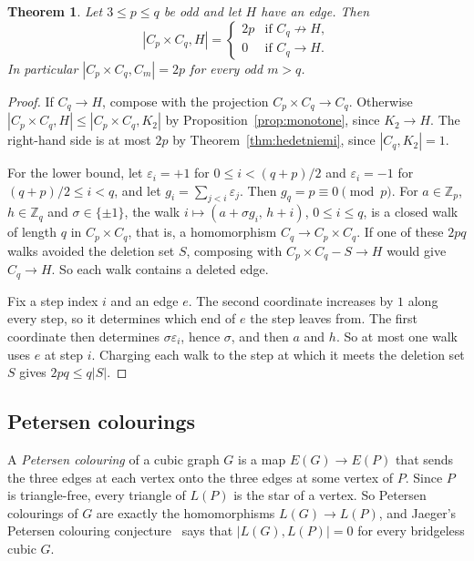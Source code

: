 \documentclass{article}
\newtheorem{theorem}{Theorem}[section]
\theoremstyle{definition}
\begin{document}
\begin{theorem}
\label{thm:CpCq}
Let $3\le p\le q$ be odd and let $H$ have an edge.  Then
\[
  |C_p\times C_q,H|=\begin{cases}2p & \text{if } C_q\not\to H,\\
  0 & \text{if } C_q\to H.\end{cases}
\]
In particular $|C_p\times C_q,C_m|=2p$ for every odd $m>q$.
\end{theorem}

\begin{proof}
If $C_q\to H$, compose with the projection $C_p\times C_q\to C_q$.  Otherwise
$|C_p\times C_q,H|\le|C_p\times C_q,K_2|$ by Proposition~\ref{prop:monotone}, since
$K_2\to H$.  The right-hand side is at most $2p$ by Theorem~\ref{thm:hedetniemi},
since $|C_q,K_2|=1$.

For the lower bound, let $\varepsilon_i=+1$ for $0\le i<(q+p)/2$ and
$\varepsilon_i=-1$ for $(q+p)/2\le i<q$, and let $g_i=\sum_{j<i}\varepsilon_j$.
Then $g_q=p\equiv0\pmod p$.  For $a\in\mathbb Z_p$, $h\in\mathbb Z_q$ and
$\sigma\in\{\pm1\}$, the walk $i\mapsto(a+\sigma g_i,\,h+i)$, $0\le i\le q$, is a
closed walk of length $q$ in $C_p\times C_q$, that is, a homomorphism
$C_q\to C_p\times C_q$.  If one of these $2pq$ walks avoided the deletion set $S$,
composing with $C_p\times C_q-S\to H$ would give $C_q\to H$.  So each walk
contains a deleted edge.

Fix a step index $i$ and an edge $e$.  The second coordinate increases by $1$
along every step, so it determines which end of $e$ the step leaves from.  The
first coordinate then determines $\sigma\varepsilon_i$, hence $\sigma$, and then
$a$ and $h$.  So at most one walk uses $e$ at step $i$.  Charging each walk to
the step at which it meets the deletion set $S$ gives $2pq\le q|S|$.
\end{proof}

\subsection{Petersen colourings}

A \emph{Petersen colouring} of a cubic graph $G$ is a map $E(G)\to E(P)$ that
sends the three edges at each vertex onto the three edges at some vertex of $P$.
Since $P$ is triangle-free, every triangle of $L(P)$ is the star of a vertex.  So
Petersen colourings of $G$ are exactly the homomorphisms $L(G)\to L(P)$, and
Jaeger's Petersen colouring conjecture~\cite{jaeger1988} says that
$|L(G),L(P)|=0$ for every bridgeless cubic $G$.
\end{document}
